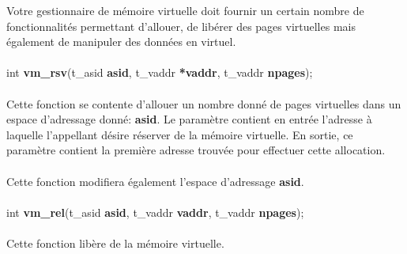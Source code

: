 \documentclass[10pt,a4wide]{article}
\begin{document}
Votre gestionnaire de m\'emoire virtuelle doit fournir un certain nombre
de fonctionnalit\'es permettant d'allouer, de lib\'erer des pages
virtuelles mais \'egalement de manipuler des donn\'ees en virtuel.

\paragraph{}

\hspace{1.5cm}int \textbf{vm\_rsv}(t\_asid \textbf{asid},
                                   t\_vaddr \textbf{*vaddr},
                                   t\_vaddr \textbf{npages});

\paragraph{}

Cette fonction se contente d'allouer un nombre donn\'e de pages virtuelles
dans un espace d'adressage donn\'e: \textbf{asid}. Le param\`etre
contient en entr\'ee l'adresse \`a laquelle l'appellant d\'esire r\'eserver
de la m\'emoire virtuelle. En sortie, ce param\`etre contient la premi\`ere
adresse trouv\'ee pour effectuer cette allocation.

\paragraph{}

Cette fonction modifiera \'egalement l'espace d'adressage \textbf{asid}.

\paragraph{}

\hspace{1.5cm}int \textbf{vm\_rel}(t\_asid \textbf{asid},
                                   t\_vaddr \textbf{vaddr},
                                   t\_vaddr \textbf{npages});

\paragraph{}

Cette fonction lib\`ere de la m\'emoire virtuelle.

\paragraph{}
\end{document}

